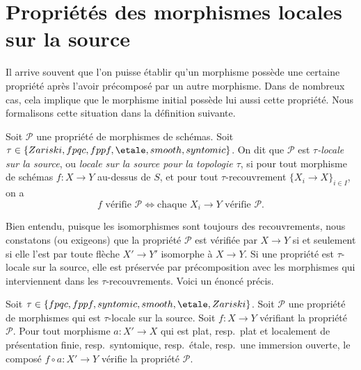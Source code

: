 














\section{Propriétés des morphismes locales sur la source}
\label{section-properties-morphisms-local-source}

\noindent
Il arrive souvent que l'on puisse établir qu'un morphisme possède une certaine
propriété après l'avoir précomposé par un autre morphisme. Dans de nombreux cas,
cela implique que le morphisme initial possède lui aussi cette propriété.
Nous formalisons cette situation dans la définition suivante.

\begin{definition}
\label{definition-property-morphisms-local-source}
Soit $\mathcal{P}$ une propriété de morphismes de schémas.
Soit $\tau \in \{Zariski, \linebreak[0] fpqc, \linebreak[0] fppf, \linebreak[0]
\etale, \linebreak[0] smooth, \linebreak[0] syntomic\}$.
On dit que $\mathcal{P}$ est
{\it $\tau$-locale sur la source}, ou
{\it locale sur la source pour la topologie $\tau$}, si pour tout
morphisme de schémas $f : X \to Y$ au-dessus de $S$, et pour tout
$\tau$-recouvrement $\{X_i \to X\}_{i \in I}$, on a
$$
f \text{ vérifie }\mathcal{P}
\Leftrightarrow
\text{chaque }X_i \to Y\text{ vérifie }\mathcal{P}.
$$
\end{definition}

\noindent
Bien entendu, puisque les isomorphismes sont toujours des recouvrements,
nous constatons (ou exigeons) que la propriété $\mathcal{P}$ est vérifiée par
$X \to Y$ si et seulement si elle l'est par toute flèche $X' \to Y'$
isomorphe à $X \to Y$. Si une propriété est $\tau$-locale sur la source,
elle est préservée par précomposition avec les morphismes qui interviennent
dans les $\tau$-recouvrements. Voici un énoncé précis.

\begin{lemma}
\label{lemma-precompose-property-local-source}
Soit $\tau \in \{fpqc, fppf, syntomic, smooth, \etale, Zariski\}$.
Soit $\mathcal{P}$ une propriété de morphismes qui est $\tau$-locale
sur la source. Soit $f : X \to Y$ vérifiant la propriété $\mathcal{P}$.
Pour tout morphisme $a : X' \to X$ qui est
plat, resp.\ plat et localement de présentation finie, resp.\ syntomique,
resp.\ \'etale, resp.\ une immersion ouverte, le composé
$f \circ a : X' \to Y$ vérifie la propriété $\mathcal{P}$.
\end{lemma}

